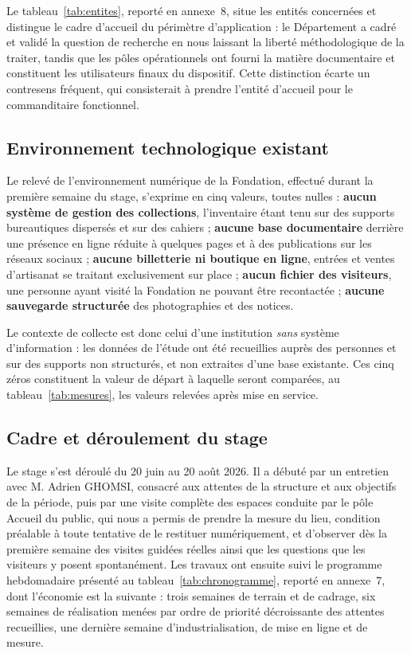 Le tableau~\ref{tab:entites}, reporté en annexe~8, situe les entités concernées
et distingue le cadre d'accueil du périmètre d'application : le Département a
cadré et validé la question de recherche en nous laissant la liberté
méthodologique de la traiter, tandis que les pôles opérationnels ont fourni la
matière documentaire et constituent les utilisateurs finaux du dispositif. Cette
distinction écarte un contresens fréquent, qui consisterait à prendre l'entité
d'accueil pour le commanditaire fonctionnel.

\subsection{Environnement technologique existant}

Le relevé de l'environnement numérique de la Fondation, effectué durant la
première semaine du stage, s'exprime en cinq valeurs, toutes nulles :
\textbf{aucun système de gestion des collections}, l'inventaire étant tenu sur
des supports bureautiques dispersés et sur des cahiers ; \textbf{aucune base
documentaire} derrière une présence en ligne réduite à quelques pages et à des
publications sur les réseaux sociaux ; \textbf{aucune billetterie ni boutique en
ligne}, entrées et ventes d'artisanat se traitant exclusivement sur place ;
\textbf{aucun fichier des visiteurs}, une personne ayant visité la Fondation ne
pouvant être recontactée ; \textbf{aucune sauvegarde structurée} des
photographies et des notices.

Le contexte de collecte est donc celui d'une institution \emph{sans} système
d'information : les données de l'étude ont été recueillies auprès des personnes
et sur des supports non structurés, et non extraites d'une base existante. Ces
cinq zéros constituent la valeur de départ à laquelle seront comparées, au
tableau~\ref{tab:mesures}, les valeurs relevées après mise en service.

\subsection{Cadre et déroulement du stage}
\label{sec:stage}

Le stage s'est déroulé du 20 juin au 20 août 2026. Il a débuté par un entretien
avec M. Adrien GHOMSI, consacré aux attentes de la structure et aux objectifs de
la période, puis par une visite complète des espaces conduite par le pôle
Accueil du public, qui nous a permis de prendre la mesure du lieu, condition
préalable à toute tentative de le restituer numériquement, et d'observer dès la
première semaine des visites guidées réelles ainsi que les questions que les
visiteurs y posent spontanément. Les travaux ont ensuite suivi le programme
hebdomadaire présenté au tableau~\ref{tab:chronogramme}, reporté en annexe~7,
dont l'économie est la suivante : trois semaines de terrain et de cadrage, six
semaines de réalisation menées par ordre de priorité décroissante des attentes
recueillies, une dernière semaine d'industrialisation, de mise en ligne et de
mesure.

